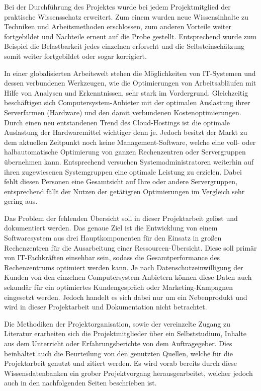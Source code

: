 Bei der Durchführung des Projektes wurde bei jedem Projektmitglied der
praktische Wissensschatz erweitert. Zum einem wurden neue Wissensinhalte zu
Techniken und Arbeitsmethoden erschlossen, zum anderen Vorteile weiter
fortgebildet und Nachteile erneut auf die Probe gestellt. Entsprechend wurde
zum Beispiel die Belastbarkeit jedes einzelnen erforscht und die
Selbsteinschätzung somit weiter fortgebildet oder sogar korrigiert.

In einer globalisierten Arbeitswelt stehen die Möglichkeiten von IT-Systemen
und dessen verbundenen Werkzeugen, wie die Optimierungen von Arbeitsabläufen
mit Hilfe von Analysen und Erkenntnissen, sehr stark im Vordergrund.
Gleichzeitig beschäftigen sich Computersystem-Anbieter mit der optimalen
Auslastung ihrer Serverfarmen (Hardware) und den damit verbundenen
Kostenoptimierungen. Durch einen neu entstandenen Trend des Cloud-Hostings ist
die optimale Auslastung der Hardwaremittel wichtiger denn je. Jedoch besitzt
der Markt zu dem aktuellen Zeitpunkt noch keine Management-Software, welche
eine voll- oder halbautomatische Optimierung von ganzen Rechenzentren oder
Servergruppen übernehmen kann. Entsprechend versuchen Systemadministratoren
weiterhin auf ihren zugewiesenen Systemgruppen eine optimale Leistung zu
erzielen. Dabei fehlt diesen Personen eine Gesamtsicht auf Ihre oder andere
Servergruppen, entsprechend fällt der Nutzen der getätigten Optimierungen im
Vergleich sehr gering aus.

Das Problem der fehlenden Übersicht soll in dieser Projektarbeit gelöst und
dokumentiert werden. Das genaue Ziel ist die Entwicklung von einem
Softwaresystem aus drei Hauptkomponenten für den Einsatz in großen
Rechenzentren für die Ausarbeitung einer Ressourcen-Übersicht. Diese soll
primär von IT-Fachkräften einsehbar sein, sodass die Gesamtperformance des
Rechenzentrums optimiert werden kann. Je nach Datenschutzeinwilligung der
Kunden von den einzelnen Computersystem-Anbietern können diese Daten auch
sekundär für ein optimiertes Kundengespräch oder Marketing-Kampagnen eingesetzt
werden. Jedoch handelt es sich dabei nur um ein Nebenprodukt und wird in dieser
Projektarbeit und Dokumentation nicht betrachtet.

Die Methodiken der Projektorganisation, sowie der vereinzelte Zugang zu
Literatur erarbeiten sich die Projektmitglieder über ein Selbststudium, Inhalte
aus dem Unterricht oder Erfahrungsberichte von dem Auftragegeber.  Dies
beinhaltet auch die Beurteilung von den genutzten Quellen, welche für die
Projektarbeit genutzt und zitiert werden. Es wird vorab bereits durch diese
Wissensdatenbanken ein grober Projektvorgang herausgearbeitet, welcher jedoch
auch in den nachfolgenden Seiten beschrieben ist.
\all%

